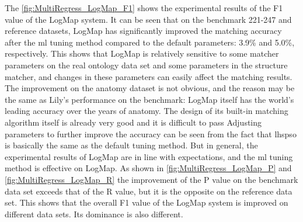 \documentclass[twoside]{article}
\begin{document}
The \ref{fig:MultiRegress_LogMap_F1} shows the experimental results of the F1 value of the LogMap system.
It can be seen that on the benchmark 221-247 and reference datasets, LogMap has significantly improved the matching accuracy after the ml tuning method compared to the default parameters: 3.9\% and 5.0\%, respectively.
This shows that LogMap is relatively sensitive to some matcher parameters on the real ontology data set and some parameters in the structure matcher, and changes in these parameters can easily affect the matching results.
The improvement on the anatomy dataset is not obvious, and the reason may be the same as Lily's performance on the benchmark: LogMap itself has the world's leading accuracy over the years of anatomy. The design of its built-in matching algorithm itself is already very good and it is difficult to pass Adjusting parameters to further improve the accuracy can be seen from the fact that lhspso is basically the same as the default tuning method. But in general, the experimental results of LogMap are in line with expectations, and the ml tuning method is effective on LogMap.
As shown in \ref{fig:MultiRegress_LogMap_P} and \ref{fig:MultiRegress_LogMap_R} the improvement of the P value on the benchmark data set exceeds that of the R value, but it is the opposite on the reference data set. This shows that the overall F1 value of the LogMap system is improved on different data sets. Its dominance is also different.
\end{document}
